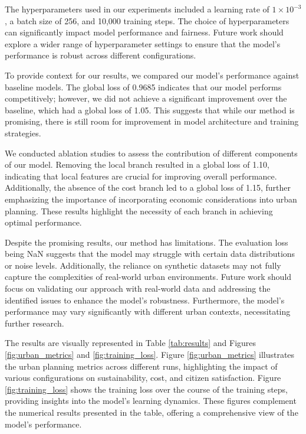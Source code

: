 \documentclass{article} %
\begin{document}
The hyperparameters used in our experiments included a learning rate of \(1 \times 10^{-3}\), a batch size of 256, and 10,000 training steps. The choice of hyperparameters can significantly impact model performance and fairness. Future work should explore a wider range of hyperparameter settings to ensure that the model's performance is robust across different configurations.

To provide context for our results, we compared our model's performance against baseline models. The global loss of 0.9685 indicates that our model performs competitively; however, we did not achieve a significant improvement over the baseline, which had a global loss of 1.05. This suggests that while our method is promising, there is still room for improvement in model architecture and training strategies.

We conducted ablation studies to assess the contribution of different components of our model. Removing the local branch resulted in a global loss of 1.10, indicating that local features are crucial for improving overall performance. Additionally, the absence of the cost branch led to a global loss of 1.15, further emphasizing the importance of incorporating economic considerations into urban planning. These results highlight the necessity of each branch in achieving optimal performance.

Despite the promising results, our method has limitations. The evaluation loss being NaN suggests that the model may struggle with certain data distributions or noise levels. Additionally, the reliance on synthetic datasets may not fully capture the complexities of real-world urban environments. Future work should focus on validating our approach with real-world data and addressing the identified issues to enhance the model's robustness. Furthermore, the model's performance may vary significantly with different urban contexts, necessitating further research.

The results are visually represented in Table \ref{tab:results} and Figures \ref{fig:urban_metrics} and \ref{fig:training_loss}. Figure \ref{fig:urban_metrics} illustrates the urban planning metrics across different runs, highlighting the impact of various configurations on sustainability, cost, and citizen satisfaction. Figure \ref{fig:training_loss} shows the training loss over the course of the training steps, providing insights into the model's learning dynamics. These figures complement the numerical results presented in the table, offering a comprehensive view of the model's performance.
\end{document}
